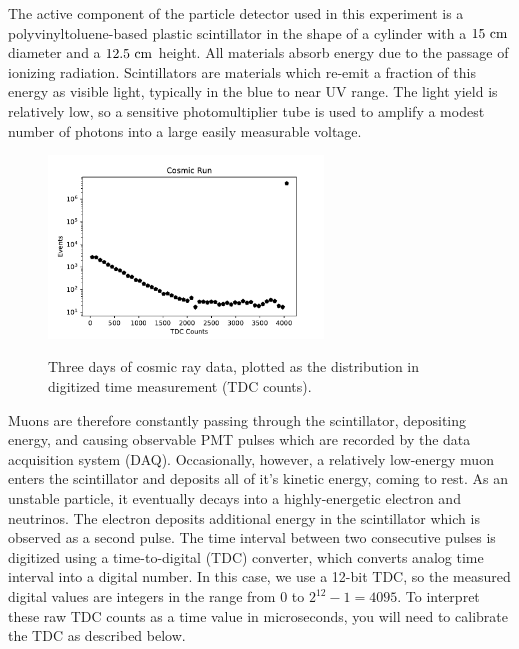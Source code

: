 The active component of the particle detector used in this experiment
is a polyvinyltoluene-based plastic scintillator in the shape of a
cylinder with a $15~\rm cm$ diameter and a $12.5~\rm cm$ height.  All
materials absorb energy due to the passage of ionizing radiation.
Scintillators are materials which re-emit a fraction of this energy as
visible light, typically in the blue to near UV range.  The light
yield is relatively low, so a sensitive photomultiplier tube is used
to amplify a modest number of photons into a large easily measurable
voltage.

\begin{figure}[htbp]
\begin{center}
{\includegraphics[width=0.65\textwidth]{figs/labs/muon/cosmics_raw.pdf}}\\
\end{center}
\caption{\label{fig:cosmics_raw}  Three days of cosmic ray data, plotted as the distribution in digitized time measurement (TDC counts).}
\end{figure}


Muons are therefore constantly passing through the scintillator,
depositing energy, and causing observable PMT pulses which are
recorded by the data acquisition system (DAQ).  Occasionally, however,
a relatively low-energy muon enters the scintillator and deposits all
of it's kinetic energy, coming to rest.  As an unstable particle, it
eventually decays into a highly-energetic electron and neutrinos.  The
electron deposits additional energy in the scintillator which is
observed as a second pulse.  The time interval between two consecutive
pulses is digitized using a time-to-digital (TDC) converter, which
converts analog time interval into a digital number.  In this case, we
use a 12-bit TDC, so the measured digital values are integers in the
range from 0 to $2^{12}-1 = 4095$.  To interpret these raw TDC counts
as a time value in microseconds, you will need to calibrate the TDC as
described below.


